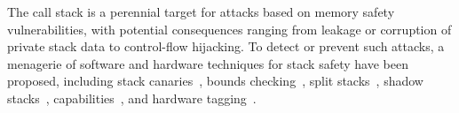 \documentclass[acmsmall,review,anonymous]{acmart}\settopmatter{printfolios=true,printccs=false,printacmref=false}
\begin{document}
\newcommand*{\MemoryLabel}[3]{\raisebox{#2}{\makebox(0,0){\hspace{#1}#3}}}

%

The call stack is a perennial target for attacks
based on memory safety vulnerabilities, with potential consequences
ranging from leakage or corruption of private stack data to
control-flow hijacking. To detect or prevent such attacks, a menagerie of
software and hardware techniques for stack safety have been proposed,
%
including stack canaries~\citep{Cowan+98},
bounds checking~\citep{NagarakatteZMZ09,NagarakatteZMZ10,DeviettiBMZ08},
split stacks~\citep{Kuznetsov+14},
shadow stacks~\citep{Dang+15,Shanbhogue+19},
capabilities~\citep{Woodruff+14,Chisnall+15,Skorstengaard+19,Skorstengaard+19b},
and hardware tagging~\citep{DBLP:conf/sp/RoesslerD18}. 
\end{document}
